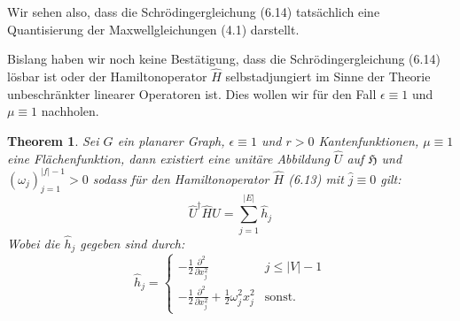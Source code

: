 \documentclass[11pt,a4paper,leqno]{report}
\newtheorem{theorem}{Theorem}[chapter]
\numberwithin{equation}{chapter}
\begin{document}
\noindent
Wir sehen also, dass die Schr\"odingergleichung (6.14) tats\"achlich eine Quantisierung der Maxwellgleichungen (4.1) darstellt.

Bislang haben wir noch keine Bestätigung, dass die Schr\"odingergleichung (6.14) l\"osbar ist oder der Hamiltonoperator $\hat{H}$ selbstadjungiert im Sinne der Theorie unbeschr\"ankter linearer Operatoren ist. Dies wollen wir f\"ur den Fall $\epsilon\equiv 1$ und $\mu\equiv 1$ nachholen.
\begin{theorem}
	Sei $G$ ein planarer Graph, $\epsilon\equiv 1$ und $r>0$ Kantenfunktionen, $\mu\equiv 1$ eine Fl\"achenfunktion, dann existiert eine unit\"are Abbildung $\hat{U}$ auf $\mathfrak{H}$ und $(\omega_j)_{j=1}^{|f|-1}>0$ sodass f\"ur den Hamiltonoperator $\hat{H}$ (6.13) mit $\hat{j}\equiv 0 $ gilt:
	\begin{equation}
	\hat{U}^\dagger\hat{H}\hat{U}  = \sum_{j=1}^{|E|}\hat{h}_j
	\end{equation}
Wobei die $\hat{h}_j$ gegeben sind durch:
\[\hat{h}_j= \begin{cases} 
-\frac{1}{2}\frac{\partial^2}{\partial x_j^2} & j\leq |V| - 1 \\
-\frac{1}{2}\frac{\partial^2}{\partial x_j^2} + \frac{1}{2}\omega_j^2 x_j^2 & \text{sonst.} 
\end{cases}
\]
\end{theorem}
\end{document}
